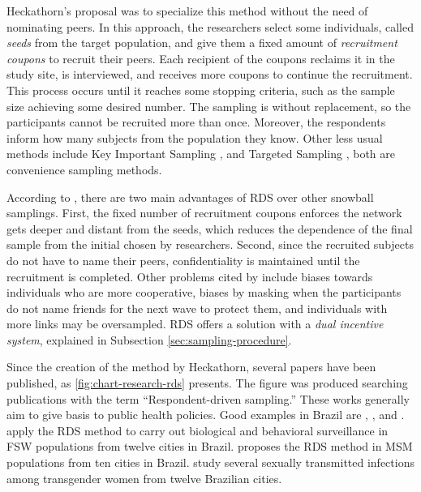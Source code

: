 Heckathorn's proposal \citeyear{heckathorn1997} was to specialize this method without the need of
nominating peers. In this approach, the researchers select some individuals,
called {\em seeds} from the target population, and give them a fixed amount of
{\em recruitment coupons} to recruit their peers. Each recipient of the coupons
reclaims it in the study site, is interviewed, and receives more coupons to
continue the recruitment. This process occurs until it reaches some stopping
criteria, such as the sample size achieving some desired number. The sampling
is without replacement, so the participants cannot be recruited more than
once. Moreover, the respondents inform how many subjects from the population
they know. Other less usual methods include Key Important Sampling \cite{deaux-callaghan1985}, 
and Targeted Sampling \cite{watters-biernacki1989}, both are convenience
sampling methods. 

According to \textcite[p. 66]{gile2018methods}, there are two main advantages
of RDS over other snowball samplings. First, the fixed number of recruitment
coupons enforces the network gets deeper and distant from the seeds, which
reduces the dependence of the final sample from the initial chosen by
researchers. Second, since the recruited subjects do not have to name their
peers, confidentiality is maintained until the recruitment is completed.
Other problems cited by \textcite[p. 175]{heckathorn1997} include biases
towards individuals who are more cooperative, biases by masking when the
participants do not name friends for the next wave to protect them, and
individuals with more links may be oversampled. RDS offers a solution with a
{\em dual incentive system}, explained in Subsection
\ref{sec:sampling-procedure}. 

Since the creation of the method by Heckathorn, several papers have been
published, as \autoref{fig:chart-research-rds} presents. The figure was produced searching
publications with the term ``Respondent-driven sampling.'' These works generally
aim to give basis to public health policies. Good examples in Brazil are
\cite{damacena2019application}, \cite{mota2012respondent}, and
\cite{bastos2018hiv}. \textcite{damacena2019application} apply the RDS method
to carry out biological and behavioral surveillance in FSW populations from twelve cities
in Brazil. \textcite{mota2012respondent} proposes the RDS method in MSM populations from ten cities in
Brazil. \textcite{bastos2018hiv} study several sexually transmitted infections among
transgender women from twelve Brazilian cities.  

